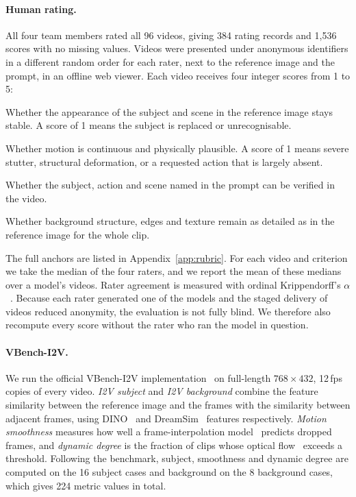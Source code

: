 \documentclass[11pt,a4paper]{article}
\begin{document}
\paragraph{Human rating.}
All four team members rated all 96 videos, giving 384 rating records and 1{,}536 scores with no missing values. Videos were presented under anonymous identifiers in a different random order for each rater, next to the reference image and the prompt, in an offline web viewer. Each video receives four integer scores from 1 to 5:
\begin{description}[leftmargin=1.4em,itemsep=1pt]
  \item[Image alignment.] Whether the appearance of the subject and scene in the reference image stays stable. A score of 1 means the subject is replaced or unrecognisable.
  \item[Motion naturalness.] Whether motion is continuous and physically plausible. A score of 1 means severe stutter, structural deformation, or a requested action that is largely absent.
  \item[Prompt adherence.] Whether the subject, action and scene named in the prompt can be verified in the video.
  \item[Background preservation.] Whether background structure, edges and texture remain as detailed as in the reference image for the whole clip.
\end{description}
The full anchors are listed in Appendix~\ref{app:rubric}. For each video and criterion we take the median of the four raters, and we report the mean of these medians over a model's videos. Rater agreement is measured with ordinal Krippendorff's $\alpha$~\citep{krippendorff2011}. Because each rater generated one of the models and the staged delivery of videos reduced anonymity, the evaluation is not fully blind. We therefore also recompute every score without the rater who ran the model in question.

\paragraph{VBench-I2V.}
We run the official VBench-I2V implementation~\citep{huang2024vbenchpp} on full-length $768\times432$, 12\,fps copies of every video. \emph{I2V subject} and \emph{I2V background} combine the feature similarity between the reference image and the frames with the similarity between adjacent frames, using DINO~\citep{caron2021dino} and DreamSim~\citep{fu2023dreamsim} features respectively. \emph{Motion smoothness} measures how well a frame-interpolation model~\citep{li2023amt} predicts dropped frames, and \emph{dynamic degree} is the fraction of clips whose optical flow~\citep{teed2020raft} exceeds a threshold. Following the benchmark, subject, smoothness and dynamic degree are computed on the 16 subject cases and background on the 8 background cases, which gives 224 metric values in total.
\end{document}
